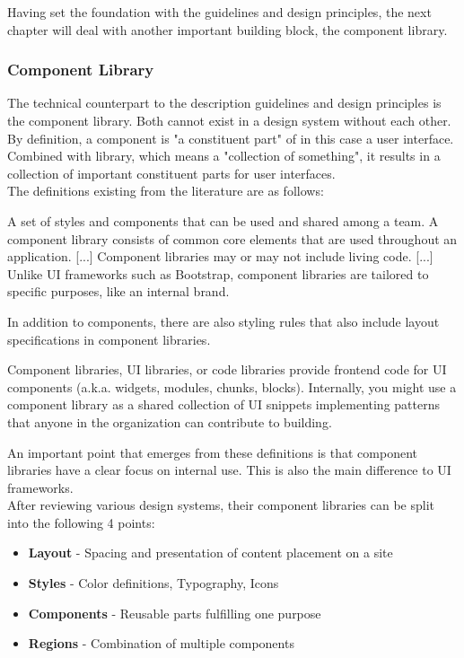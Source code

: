 Having set the foundation with the guidelines and design principles, the next chapter will deal with another important building block, the component library.
\subsubsection{Component Library}
The technical counterpart to the description guidelines and design principles is the component library. Both cannot exist in a design system without each other.  By definition, a component is "a constituent part" \cite{component_definition} of in this case a user interface.  Combined with library, which means a "collection of something"\cite{library_definition}, it results in a collection of important constituent parts for user interfaces.  \\
The definitions existing from the literature are as follows:
\begin{tcolorbox}[title=Definition of component library by \citet*{vesselov_building_2019}]
A set of styles and components that can be used and shared among a team. A component library consists of common core elements that are used throughout an application. [...] Component libraries may or may not include living code. [...] Unlike UI frameworks such as Bootstrap, component libraries are tailored to specific purposes, like an internal brand.
\end{tcolorbox}
In addition to components, there are also styling rules that also include layout specifications in component libraries. 
\begin{tcolorbox}[title=Definition of component library by \citet*{macdonald_practical_2019}]
Component libraries, UI libraries, or code libraries provide frontend code for UI components (a.k.a. widgets, modules, chunks, blocks). Internally, you might use a component library as a shared collection of UI snippets implementing patterns that anyone in the organization can contribute to building.
\end{tcolorbox}
An important point that emerges from these definitions is that component libraries have a clear focus on internal use. This is also the main difference to UI frameworks. \\
After reviewing various design systems, their component libraries can be split into the following 4 points:
\begin{itemize}
	\item \textbf{Layout} - Spacing and presentation of content placement on a site
	\item \textbf{Styles} - Color definitions, Typography, Icons
	\item \textbf{Components} - Reusable parts fulfilling one purpose
	\item \textbf{Regions} - Combination of multiple components 
\end{itemize}





